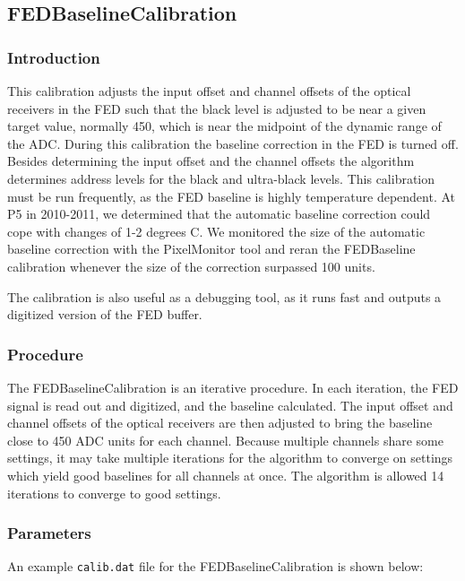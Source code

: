 \subsection{FEDBaselineCalibration}
\label{sec:FEDBaselineCalibration}

\subsubsection{Introduction}
This calibration adjusts the input offset and channel offsets of the optical receivers in the FED such that the black level is adjusted to be near a given target value, normally 450, which is near the midpoint of the dynamic range of the ADC. During this calibration the baseline correction in the FED is turned off. Besides determining the input offset and the channel offsets the algorithm determines address levels for the black and ultra-black levels. This calibration must be run frequently, as the FED baseline is highly temperature dependent. At P5 in 2010-2011, we determined that the automatic baseline correction could cope with changes of 1-2 degrees C.  We monitored the size of the automatic baseline correction with the PixelMonitor tool and reran the FEDBaseline calibration whenever the size of the correction surpassed 100 units.

The calibration is also useful as a debugging tool, as it runs fast and outputs a digitized version of the FED buffer.  

\subsubsection{Procedure}
The FEDBaselineCalibration is an iterative procedure.  In each iteration, the FED signal is read out and digitized, and the baseline calculated.  The input offset and channel offsets of the optical receivers are then adjusted to bring the baseline close to 450 ADC units for each channel.  Because multiple channels share some settings, it may take multiple iterations for the algorithm to converge on settings which yield good baselines for all channels at once. The algorithm is allowed 14 iterations to converge to good settings.

\subsubsection{Parameters}
An example \verb|calib.dat| file for the FEDBaselineCalibration is shown below:

